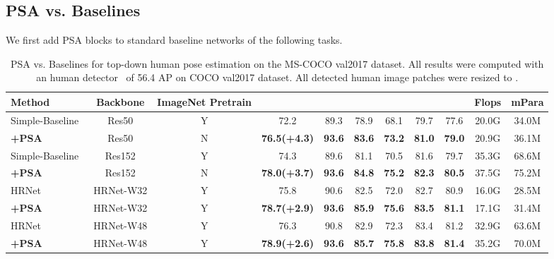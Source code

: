 \documentclass[10pt,twocolumn,letterpaper]{article}
\begin{document}
\subsection{PSA vs. Baselines}
We first add PSA blocks to standard baseline networks of the following tasks.

\begin{table*}[!htb]
\centering
\fontsize{7}{8}\selectfont
\setlength{\tabcolsep}{4.6pt}
\begin{tabular}{l|c|c|cccccc|c|c}
\hline
Method       & Backbone  & ImageNet Pretrain    &    &  &  &   &   &   & Flops  & mPara  \\ \hline \hline
Simple-Baseline~\cite{Xiao18} & Res50 & Y &  72.2 &89.3 &78.9 & 68.1 &79.7 &77.6 &20.0G&34.0M\\
\textbf{+PSA}    & Res50   &N   &  \textbf{76.5(+4.3)} & \textbf{93.6} & \textbf{83.6} & \textbf{73.2} & \textbf{81.0} &  \textbf{79.0} & 20.9G & 36.1M\\
\hline
Simple-Baseline~\cite{Xiao18} & Res152 & Y &  74.3 &89.6 &81.1 &70.5 &81.6 &79.7 &35.3G&68.6M\\
\textbf{+PSA}      & Res152 & N    &  \textbf{78.0(+3.7)} & \textbf{93.6} & \textbf{84.8} & \textbf{75.2} & \textbf{82.3} &  \textbf{80.5}  &37.5G & 75.2M  \\
\hline
HRNet~\cite{Sun2019} & HRNet-W32 & Y &   75.8 &90.6  &82.5 & 72.0 & 82.7 &  80.9 &16.0G&28.5M\\
\textbf{+PSA}   & HRNet-W32 & Y& \textbf{78.7(+2.9)} & \textbf{93.6} & \textbf{85.9} & \textbf{75.6} & \textbf{83.5} &  \textbf{81.1}  &17.1G & 31.4M\\ 
\hline
HRNet~\cite{Sun2019} & HRNet-W48 & Y &   76.3 &90.8 &82.9 &72.3 &83.4 &81.2 &32.9G&63.6M\\
\textbf{+PSA}      & HRNet-W48 & Y    &  \textbf{78.9(+2.6)} & \textbf{93.6} & \textbf{85.7} & \textbf{75.8} & \textbf{83.8} &  \textbf{81.4}  &35.2G&70.0M\\ 
\hline
\end{tabular}
\caption{ PSA vs. Baselines for top-down human pose estimation on the MS-COCO val2017 dataset. All results were computed with an human detector~\cite{Xiao18} of 56.4 AP on COCO val2017 dataset. All detected human image patches were resized to . }
\label{table:COCO_Pose}
\end{table*}
\end{document}

